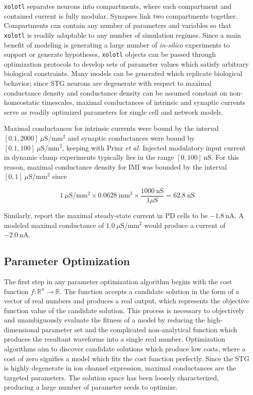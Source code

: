 
\texttt{xolotl} separates neurons into compartments, where each compartment and contained current is fully modular. Synapses link two compartments together. Compartments can contain any number of parameters and variables so that \texttt{xolotl} is readily adaptable to any number of simulation regimes. Since a main benefit of modeling is generating a large number of \textit{in-silico} experiments to support or generate hypotheses, \texttt{xolotl} objects can be passed through optimization protocols to develop sets of parameter values which satisfy arbitrary biological constraints. Many models can be generated which replicate biological behavior; since \acs{STG} neurons are degenerate with respect to maximal conductance density and conductance density can be assumed constant on non-homeostatic timescales, maximal conductances of intrinsic and synaptic currents serve as readily optimized parameters for single cell and network models.

Maximal conductances for intrinsic currents were bound by the interval $[0.1, 2000]~\mu \mathrm{S/mm^2}$ and synaptic conductances were bound by $[0.1,100]~\mu \mathrm{S/mm^2}$, keeping with Prinz \textit{et al.} Injected modulatory input current in dynamic clamp experiments typically lies in the range $[0,100]~\mathrm{nS}$. For this reason, maximal conductance density for \acs{IMI} was bounded by the interval $[0,1]~\mu \mathrm{S/mm^2}$ since

\begin{equation*}
	1~\mu \mathrm{S/mm^2} \times 0.0628~\mathrm{mm^2} \times \frac{1000~\mathrm{nS}}{1 \mu \mathrm{S}} = 62.8~\mathrm{nS}
\end{equation*}

Similarly, \citeauthor{SwensenModulatorsconvergentcellular2001} report the maximal steady-state current in \acs{PD} cells to be $-1.8~\mathrm{nA}$. A modeled maximal conductance of $1.0~\mu \mathrm{S/mm^2}$ would produce a current of $-2.0~\mathrm{nA}$. 

\subsection{Parameter Optimization} \label{sec:parameteroptimization}
The first step in any parameter optimization algorithm begins with the cost function $f: \mathbb{R}^n \rightarrow \mathbb{R}$. The function accepts a candidate solution in the form of a vector of real numbers and produces a real output, which represents the objective function value of the candidate solution. This process is necessary to objectively and unambiguously evaluate the fitness of a model by reducing the high-dimensional parameter set and the complicated non-analytical function which produces the resultant waveforms into a single real number. Optimization algorithms aim to discover candidate solutions which produce low costs, where a cost of zero signifies a model which fits the cost function perfectly. Since the \acs{STG} is highly degenerate in ion channel expression, maximal conductances are the targeted parameters. The solution space has been loosely characterized, producing a large number of parameter seeds to optimize.

